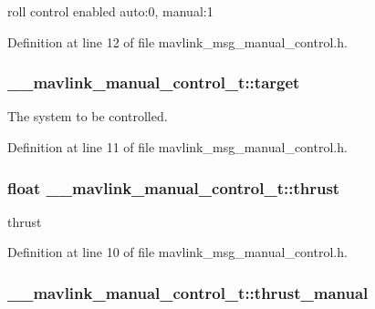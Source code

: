 roll control enabled auto\-:0, manual\-:1 



Definition at line 12 of file mavlink\-\_\-msg\-\_\-manual\-\_\-control.\-h.

\hypertarget{struct____mavlink__manual__control__t_ac69f96effc87ea6377989b2350a2a4eb}{
\subsubsection[{target}]{ \-\_\-\-\_\-mavlink\-\_\-manual\-\_\-control\-\_\-t\-::target}}\label{struct____mavlink__manual__control__t_ac69f96effc87ea6377989b2350a2a4eb}


The system to be controlled. 



Definition at line 11 of file mavlink\-\_\-msg\-\_\-manual\-\_\-control.\-h.

\hypertarget{struct____mavlink__manual__control__t_a04cd9731dbcd6359b4f2cc3ae34c410a}{
\subsubsection[{thrust}]{\setlength{\rightskip}{0pt plus 5cm}float \-\_\-\-\_\-mavlink\-\_\-manual\-\_\-control\-\_\-t\-::thrust}}\label{struct____mavlink__manual__control__t_a04cd9731dbcd6359b4f2cc3ae34c410a}


thrust 



Definition at line 10 of file mavlink\-\_\-msg\-\_\-manual\-\_\-control.\-h.

\hypertarget{struct____mavlink__manual__control__t_a5c4e15946d0218be1f6cd7a7a01fde70}{
\subsubsection[{thrust\-\_\-manual}]{ \-\_\-\-\_\-mavlink\-\_\-manual\-\_\-control\-\_\-t\-::thrust\-\_\-manual}}\label{struct____mavlink__manual__control__t_a5c4e15946d0218be1f6cd7a7a01fde70}



